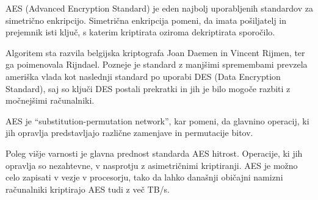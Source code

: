 AES (Advanced Encryption Standard) je eden najbolj uporabljenih standardov za simetrično enkripcijo. Simetrična enkripcija pomeni, da imata pošiljatelj in prejemnik isti ključ, s katerim kriptirata oziroma dekriptirata sporočilo. 

Algoritem sta razvila belgijska kriptografa Joan Daemen in Vincent Rijmen, ter ga poimenovala Rijndael. Pozneje je standard z manjšimi spremembami prevzela ameriška vlada kot naslednji standard po uporabi DES (Data Encryption Standard), saj so ključi DES postali prekratki in jih je bilo mogoče razbiti z močnejšimi računalniki.

AES je ``substitution-permutation network'', kar pomeni, da glavnino operacij, ki jih opravlja predstavljajo različne zamenjave in permutacije bitov.   

Poleg višje varnosti je glavna prednost standarda AES hitrost. Operacije, ki jih opravlja so nezahtevne, v nasprotju z asimetričnimi kriptiranji. AES je možno celo zapisati v vezje v procesorju, tako da lahko današnji običajni namizni računalniki kriptirajo AES tudi z več TB/s.

